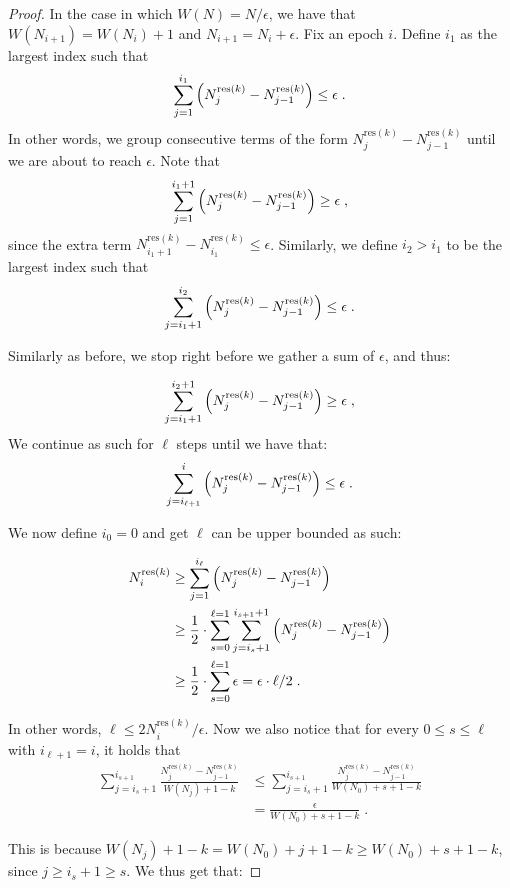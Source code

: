 \documentclass[sigconf]{acmart}
\begin{document}
\begin{proof}

In the case in which $W(N)=N/\epsilon$, we have that $W(N_{i+1})=W(N_i)+1$ and $N_{i+1}=N_i + \epsilon$. Fix an epoch $i$. Define $i_1$ as the largest index such that $$\sum_{j=1}^{i_1} \left(N^{\text{res}(k)}_j- N^{\text{res}(k)}_{j-1}\right) \leq \epsilon \;.$$  In other words, we group consecutive terms of the form $N^{\text{res}(k)}_j- N^{\text{res}(k)}_{j-1}$ until we are about to reach $\epsilon$. Note that
$$\sum_{j=1}^{i_1+1} \left(N^{\text{res}(k)}_j- N^{\text{res}(k)}_{j-1}\right) \geq  \epsilon \;,$$
since the extra term $N^{\text{res}(k)}_{i_1+1}- N^{\text{res}(k)}_{i_1} \leq \epsilon$.
Similarly, we define $i_2 > i_1$ to be the largest index such that $$\sum_{j=i_1+1}^{i_2} \left(N^{\text{res}(k)}_j- N^{\text{res}(k)}_{j-1}\right) \leq \epsilon \;.$$

Similarly as before, we stop right before we gather a sum of $\epsilon$, and thus:

$$\sum_{j=i_{1}+1}^{i_2+1} \left(N^{\text{res}(k)}_j- N^{\text{res}(k)}_{j-1}\right) \geq  \epsilon \;,$$
We continue as such for $\ell$ steps until we have that:
$$\sum_{j=i_{\ell+1}}^{i} \left(N^{\text{res}(k)}_j- N^{\text{res}(k)}_{j-1}\right) \leq \epsilon \;.$$

We now define $i_0=0$ and get $\ell$ can be upper bounded as such:

\begin{align*}
	N^{\text{res}(k)}_i  & \geq \sum_{j=1}^{i_{\ell}} \left(N^{\text{res}(k)}_j- N^{\text{res}(k)}_{j-1}\right)\\
	&\geq \frac{1}{2} \cdot \sum_{s=0}^{\ell=1} \sum_{j=i_{s}+1}^{i_{s+1}+1} \left(N^{\text{res}(k)}_j- N^{\text{res}(k)}_{j-1}\right) \\
	&\geq \frac{1}{2} \cdot \sum_{s=0}^{\ell=1}  \epsilon = \epsilon \cdot \ell/2 \;.
\end{align*}

In other words, $\ell \leq 2	N^{\text{res}(k)}_i  /\epsilon$. Now we also notice that for every $0 \leq s \leq \ell$ with $i_{\ell+1}=i$, it holds that
\begin{align*}
	\sum_{j=i_s+1}^{i_{s+1}}\frac{N^{\text{res}(k)}_j- N^{\text{res}(k)}_{j-1}}{W(N_j)+1-k} &\leq \sum_{j=i_s+1}^{i_{s+1}} \frac{N^{\text{res}(k)}_j- N^{\text{res}(k)}_{j-1}}{W(N_0)+s+1-k} \\
	&= \frac{\epsilon}{W(N_0)+s+1-k} \;.
\end{align*}

This is because $W(N_j)+1-k = W(N_0)+j+1-k \geq W(N_0)+s+1-k$, since $j \geq i_s+1 \geq s$. We thus get that:



\end{proof}
\end{document}
